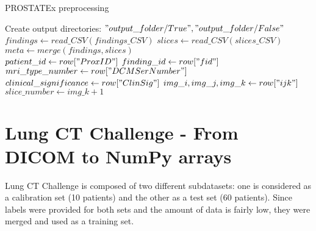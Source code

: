 \begin{algorithm}
    \caption{PROSTATEx preprocessing}
    \label{alg:PROSTATEx_preprocessing}
    \begin{algorithmic}[1] %
        		\State Create output directories: $"output\_folder/True", "output\_folder/False"$\\
        		\State $findings \gets read\_CSV(findings\_CSV)$ 
        		\State $slices \gets read\_CSV(slices\_CSV)$ 
            \State $meta \gets merge(findings, slices)$\\
            		\State $patient\_id \gets row["ProxID"]$
            		\State $finding\_id \gets row["fid"]$
            		\State $mri\_type\_number \gets row["DCMSerNumber"]$
            		\State $clinical\_significance \gets row["ClinSig"]$
            		\State $img\_i, img\_j, img\_k \gets row["ijk"]$
            		\State $slice\_number \gets img\_k + 1$ \\
                						 
                					\EndIf
                				\EndFor
                			\EndIf
            			\EndFor
            		\EndFor
            \EndFor
        \EndProcedure
    \end{algorithmic}
\end{algorithm}



\section{Lung CT Challenge - From DICOM to NumPy arrays}

Lung CT Challenge is composed of two different subdatasets: one is considered as a calibration set (10 patients) and the other as a test set (60 patients). Since labels were provided for both sets and the amount of data is fairly low, they were merged and used as a training set. 

